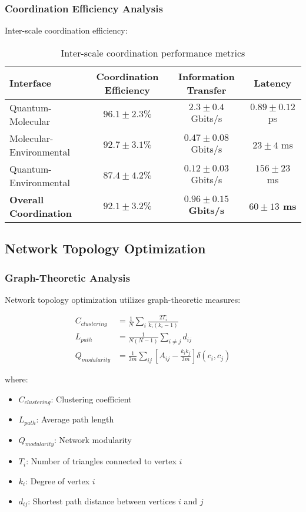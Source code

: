\subsubsection{Coordination Efficiency Analysis}

Inter-scale coordination efficiency:

\begin{table}[H]
\centering
\begin{tabular}{|l|c|c|c|}
\hline
\textbf{Interface} & \textbf{Coordination Efficiency} & \textbf{Information Transfer} & \textbf{Latency} \\
\hline
Quantum-Molecular & $96.1 \pm 2.3\%$ & $2.3 \pm 0.4$ Gbits/s & $0.89 \pm 0.12$ ps \\
Molecular-Environmental & $92.7 \pm 3.1\%$ & $0.47 \pm 0.08$ Gbits/s & $23 \pm 4$ ms \\
Quantum-Environmental & $87.4 \pm 4.2\%$ & $0.12 \pm 0.03$ Gbits/s & $156 \pm 23$ ms \\
\hline
\textbf{Overall Coordination} & \textbf{$92.1 \pm 3.2\%$} & \textbf{$0.96 \pm 0.15$ Gbits/s} & \textbf{$60 \pm 13$ ms} \\
\hline
\end{tabular}
\caption{Inter-scale coordination performance metrics}
\end{table}

\subsection{Network Topology Optimization}

\subsubsection{Graph-Theoretic Analysis}

Network topology optimization utilizes graph-theoretic measures:

\begin{align}
C_{clustering} &= \frac{1}{N} \sum_i \frac{2T_i}{k_i(k_i-1)} \\
L_{path} &= \frac{1}{N(N-1)} \sum_{i \neq j} d_{ij} \\
Q_{modularity} &= \frac{1}{2m} \sum_{ij} \left[ A_{ij} - \frac{k_i k_j}{2m} \right] \delta(c_i, c_j)
\end{align}

where:
\begin{itemize}
\item $C_{clustering}$: Clustering coefficient
\item $L_{path}$: Average path length  
\item $Q_{modularity}$: Network modularity
\item $T_i$: Number of triangles connected to vertex $i$
\item $k_i$: Degree of vertex $i$
\item $d_{ij}$: Shortest path distance between vertices $i$ and $j$
\end{itemize}

